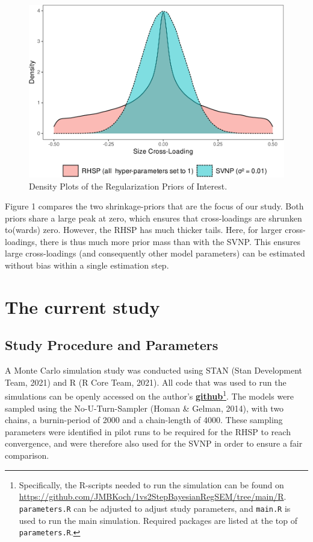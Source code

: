 \documentclass[
  english,
  man, donotrepeattitle,floatsintext]{apa6}
\begin{document}
\begin{figure}
\centering
\includegraphics{JMBKoch_thesis_files/figure-latex/unnamed-chunk-1-1.pdf}
\caption{\label{fig:unnamed-chunk-1}Density Plots of the Regularization Priors of Interest.}
\end{figure}

Figure 1 compares the two shrinkage-priors that are the focus of our study. Both priors share a large peak at zero, which ensures that cross-loadings are shrunken to(wards) zero. However, the RHSP has much thicker tails. Here, for larger cross-loadings, there is thus much more prior mass than with the SVNP. This ensures large cross-loadings (and consequently other model parameters) can be estimated without bias within a single estimation step.

\hypertarget{the-current-study}{%
\section{The current study}\label{the-current-study}}

\hypertarget{study-procedure-and-parameters}{%
\subsection{Study Procedure and Parameters}\label{study-procedure-and-parameters}}

A Monte Carlo simulation study was conducted using STAN (Stan Development Team, 2021) and R (R Core Team, 2021). All code that was used to run the simulations can be openly accessed on the author's \href{https://github.com/JMBKoch/1vs2StepBayesianRegSEM}{\textbf{github}}\footnote{Specifically, the R-scripts needed to run the simulation can be found on \url{https://github.com/JMBKoch/1vs2StepBayesianRegSEM/tree/main/R}. \texttt{parameters.R} can be adjusted to adjust study parameters, and \texttt{main.R} is used to run the main simulation. Required packages are listed at the top of \texttt{parameters.R}.}. The models were sampled using the No-U-Turn-Sampler (Homan \& Gelman, 2014), with two chains, a burnin-period of 2000 and a chain-length of 4000. These sampling parameters were identified in pilot runs to be required for the RHSP to reach convergence, and were therefore also used for the SVNP in order to ensure a fair comparison.
\end{document}
